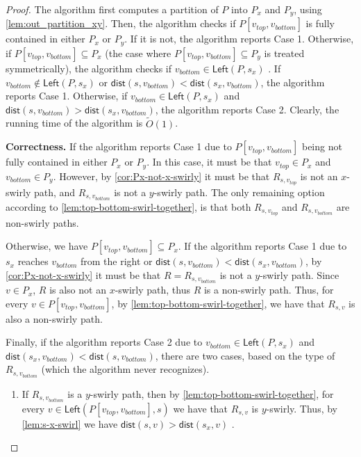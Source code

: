 \documentclass{article}
\newcommand{\Left}{\mathsf{Left}}
\newcommand{\dist}{\mathsf{dist}}
\newcommand{\Otild}{\tilde{O}}
\begin{document}
\begin{proof}
    The algorithm first computes a partition of $P$ into $P_x$ and $P_y$, using \cref{lem:out_partition_xy}.
    Then, the algorithm checks if $P[v_{top},v_{bottom}]$ is fully contained in either $P_x$ or $P_y$.
    If it is not, the algorithm reports Case 1.
    Otherwise, if $P[v_{top},v_{bottom}]\subseteq P_x$ (the case where $P[v_{top},v_{bottom}]\subseteq P_y$ is treated symmetrically), the algorithm checks if $v_{bottom}\in\Left(P,s_x)$ .
    If $v_{bottom}\notin\Left(P,s_x)$  or $\dist(s,v_{bottom})<\dist(s_x,v_{bottom})$, the algorithm reports Case 1.
    Otherwise, if $v_{bottom}\in\Left(P,s_x)$ and $\dist(s,v_{bottom})>\dist(s_x,v_{bottom})$, the algorithm reports Case 2.
    Clearly, the running time of the algorithm is $\Otild(1)$.

    \medskip
\noindent
{\bf Correctness.}
    If the algorithm reports Case 1 due to $P[v_{top},v_{bottom}]$ being not fully contained in either $P_x$ or $P_y$.
    In this case, it must be that $v_{top}\in P_x$ and $v_{bottom}\in P_y$.
    However, by \cref{cor:Px-not-x-swirly} it must be that $R_{s,v_{top}}$ is not an $x$-swirly path, and $R_{s,v_{bottom}}$ is not a $y$-swirly path.
    The only remaining option according to \cref{lem:top-bottom-swirl-together}, is that both $R_{s,v_{top}}$  and $R_{s,v_{bottom}}$ are non-swirly paths.

    Otherwise, we have $P[v_{top},v_{bottom}]\subseteq P_x$.
    If the algorithm reports Case 1 due to $s_x$ reaches $v_{bottom}$ from the right or $\dist(s,v_{bottom})<\dist(s_x,v_{bottom})$, by \cref{cor:Px-not-x-swirly} it must be that $R=R_{s,v_{bottom}}$ is not a $y$-swirly path.
    Since $v\in P_x$, $R$ is also not an $x$-swirly path, thus $R$ is a non-swirly path.
    Thus, for every $v\in P[v_{top},v_{bottom}]$, by \cref{lem:top-bottom-swirl-together}, we have that $R_{s,v}$ is also a non-swirly path.

    Finally, if the algorithm reports Case 2 due to $v_{bottom}\in\Left(P,s_x)$ and $\dist(s_x,v_{bottom})<\dist(s,v_{bottom})$, there are two cases, based on the type of $R_{s,v_{bottom}}$ (which the algorithm never recognizes).
    \begin{enumerate}
        \item If $R_{s,v_{bottom}}$ is a $y$-swirly path, then by \cref{lem:top-bottom-swirl-together}, for every $v\in \Left(P[v_{top},v_{bottom}],s)$ we have that $R_{s,v}$  is $y$-swirly.
        Thus, by \cref{lem:s-x-swirl} we have  $\dist(s,v)>\dist(s_x,v)$ .


\end{enumerate}
\end{proof}
\end{document}
